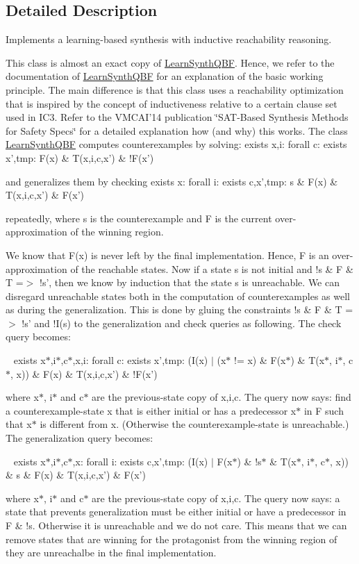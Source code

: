\subsection{Detailed Description}
Implements a learning-\/based synthesis with inductive reachability reasoning. 

This class is almost an exact copy of \hyperlink{classLearnSynthQBF}{Learn\-Synth\-Q\-B\-F}. Hence, we refer to the documentation of \hyperlink{classLearnSynthQBF}{Learn\-Synth\-Q\-B\-F} for an explanation of the basic working principle. The main difference is that this class uses a reachability optimization that is inspired by the concept of inductiveness relative to a certain clause set used in I\-C3. Refer to the V\-M\-C\-A\-I'14 publication \char`\"{}\-S\-A\-T-\/\-Based Synthesis Methods for Safety Specs\char`\"{} for a detailed explanation how (and why) this works. The class \hyperlink{classLearnSynthQBF}{Learn\-Synth\-Q\-B\-F} computes counterexamples by solving\-: exists x,i\-: forall c\-: exists x',tmp\-: F(x) \& T(x,i,c,x') \& !\-F(x') \par
 and generalizes them by checking exists x\-: forall i\-: exists c,x',tmp\-: s \& F(x) \& T(x,i,c,x') \& F(x') \par
 repeatedly, where s is the counterexample and F is the current over-\/approximation of the winning region.

We know that F(x) is never left by the final implementation. Hence, F is an over-\/approximation of the reachable states. Now if a state s is not initial and !s \& F \& T =$>$ !s', then we know by induction that the state s is unreachable. We can disregard unreachable states both in the computation of counterexamples as well as during the generalization. This is done by gluing the constraints !s \& F \& T =$>$ !s' and !\-I(s) to the generalization and check queries as following. The check query becomes\-: \par
 ~ exists x$\ast$,i$\ast$,c$\ast$,x,i\-: forall c\-: exists x',tmp\-: (I(x) $|$ (x$\ast$ != x) \& F(x$\ast$) \& T(x$\ast$, i$\ast$, c$\ast$, x)) \& F(x) \& T(x,i,c,x') \& !\-F(x') \par
 where x$\ast$, i$\ast$ and c$\ast$ are the previous-\/state copy of x,i,c. The query now says\-: find a counterexample-\/state x that is either initial or has a predecessor x$\ast$ in F such that x$\ast$ is different from x. (Otherwise the counterexample-\/state is unreachable.) The generalization query becomes\-: \par
 ~ exists x$\ast$,i$\ast$,c$\ast$,x\-: forall i\-: exists c,x',tmp\-: (I(x) $|$ F(x$\ast$) \& !s$\ast$ \& T(x$\ast$, i$\ast$, c$\ast$, x)) \& s \& F(x) \& T(x,i,c,x') \& F(x') \par
 where x$\ast$, i$\ast$ and c$\ast$ are the previous-\/state copy of x,i,c. The query now says\-: a state that prevents generalization must be either initial or have a predecessor in F \& !s. Otherwise it is unreachable and we do not care. This means that we can remove states that are winning for the protagonist from the winning region of they are unreachalbe in the final implementation.

